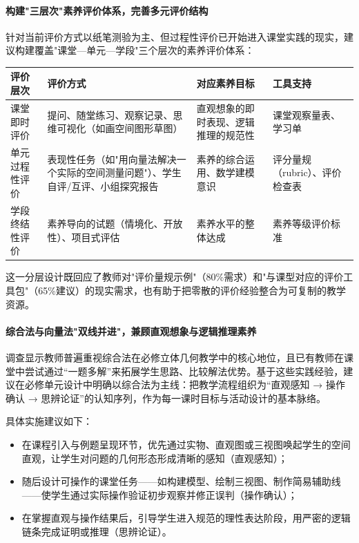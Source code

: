 \documentclass[UTF8,a4paper,12pt,twoside]{ctexart}
\begin{document}
\paragraph{构建"三层次"素养评价体系，完善多元评价结构}

针对当前评价方式以纸笔测验为主、但过程性评价已开始进入课堂实践的现实，建议构建覆盖"课堂—单元—学段"三个层次的素养评价体系：

\begin{center}
\begin{tabular}{|p{}|p{}|p{}|p{}|}
\hline
评价层次 & 评价方式 & 对应素养目标 & 工具支持 \\
\hline
课堂即时评价 & 提问、随堂练习、观察记录、思维可视化（如画空间图形草图） & 直观想象的即时表现、逻辑推理的规范性 & 课堂观察量表、学习单 \\
\hline
单元过程性评价 & 表现性任务（如"用向量法解决一个实际的空间测量问题"）、学生自评/互评、小组探究报告 & 素养的综合运用、数学建模意识 & 评分量规（rubric）、评价检查表 \\
\hline
学段终结性评价 & 素养导向的试题（情境化、开放性）、项目式评估 & 素养水平的整体达成 & 素养等级评价标准 \\
\hline
\end{tabular}
\end{center}

这一分层设计既回应了教师对"评价量规示例"（80\%需求）和"与课型对应的评价工具包"（65\%建议）的现实需求，也有助于把零散的评价经验整合为可复制的教学资源。

\paragraph{综合法与向量法"双线并进"，兼顾直观想象与逻辑推理素养}
调查显示教师普遍重视综合法在必修立体几何教学中的核心地位，且已有教师在课堂中尝试通过“一题多解”来拓展学生思路、比较解法优势。基于这些实践经验，建议在必修单元设计中明确以综合法为主线：把教学流程组织为“直观感知 → 操作确认 → 思辨论证”的认知序列，作为每一课时目标与活动设计的基本脉络。

具体实施建议如下：

\begin{itemize}
\item 在课程引入与例题呈现环节，优先通过实物、直观图或三视图唤起学生的空间直观，让学生对问题的几何形态形成清晰的感知（直观感知）；
\item 随后设计可操作的课堂任务——如构建模型、绘制三视图、制作简易辅助线——使学生通过实际操作验证初步观察并修正误判（操作确认）；
\item 在掌握直观与操作结果后，引导学生进入规范的理性表达阶段，用严密的逻辑链条完成证明或推理（思辨论证）。
\end{itemize}
\end{document}
